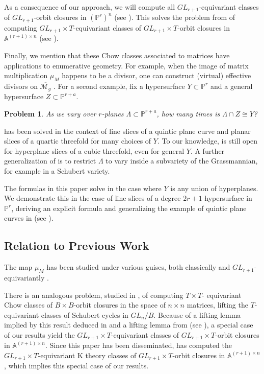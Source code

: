 \documentclass[12pt]{amsart}
\newcommand{\mb}{\mathbb}
\newcommand{\ol}{\overline}
\theoremstyle{plain}
\newtheorem{Pro*}{Problem}
\theoremstyle{definition}
\theoremstyle{remark}
\begin{document}
As a consequence of our approach, we will compute all $GL_{r+1}$-equivariant classes of $GL_{r+1}$-orbit closures in $(\mb{P}^r)^n$ (see ). This solves the problem from \cite{Fink} of computing $GL_{r+1}\times T$-equivariant classes of $GL_{r+1}\times T$-orbit closures in $\mb{A}^{(r+1)\times n}$ (see ).

Finally, we mention that these Chow classes associated to matrices have applications to enumerative geometry. For example, when the image of matrix multiplication $\mu_M$ happens to be a divisor, one can construct (virtual) effective divisors on $\ol{\mathscr{M}_g}$ \cite[Example 1.3]{T19}. For a second example, fix a hypersurface $Y\subset \mb{P}^r$ and a general hypersurface $Z\subset \mb{P}^{r+a}$.
\begin{Pro*}
\label{slicing}
As we vary over $r$-planes $\Lambda\subset\mb{P}^{r+a}$, how many times is $\Lambda\cap Z\cong Y$? 
\end{Pro*}
 has been solved in the context of line slices of a quintic plane curve \cite{Laza} and planar slices of a quartic threefold \cite[Corollary 1.3]{LPT19} for many choices of $Y$. To our knowledge,  is still open for hyperplane slices of a cubic threefold, even for general $Y$. A further generalization of  is to restrict $\Lambda$ to vary inside a subvariety of the Grassmannian, for example in a Schubert variety. 

The formulas in this paper solve  in the case where $Y$ is any union of hyperplanes. We demonstrate this in the case of line slices of a degree $2r+1$ hypersurface in $\mb{P}^r$, deriving an explicit formula and generalizing the example of quintic plane curves in \cite{Laza} (see ). 
\subsection{Relation to Previous Work}
The map $\mu_M$ has been studied under various guises, both classically \cite{AF93, Binglin2, Kapranov, Binglin, Serdica} and $GL_{r+1}$-equivariantly \cite{berget:hal-01283166,BergetPaper,Fink,Harm,FS12,SpeInvariant}.

There is an analogous problem, studied in \cite{KMS,KMY09}, of computing $T\times T$- equivariant Chow classes of $B\times B$-orbit closures in the space of $n\times n$ matrices, lifting the $T$-equivariant classes of Schubert cycles in $GL_n/B$. Because of a lifting lemma implied by this result deduced in \cite{Fink} and a lifting lemma from \cite{FR07} (see ), a special case of our results yield the $GL_{r+1} \times T$-equivariant classes of $GL_{r+1}\times T$-orbit closures in $\mb{A}^{(r+1)\times n}$. Since this paper has been disseminated, \cite{BF19} has computed the $GL_{r+1}\times T$-equivariant K theory classes of $GL_{r+1}\times T$-orbit closures in $\mb{A}^{(r+1)\times n}$, which implies this special case of our results.
\end{document}
